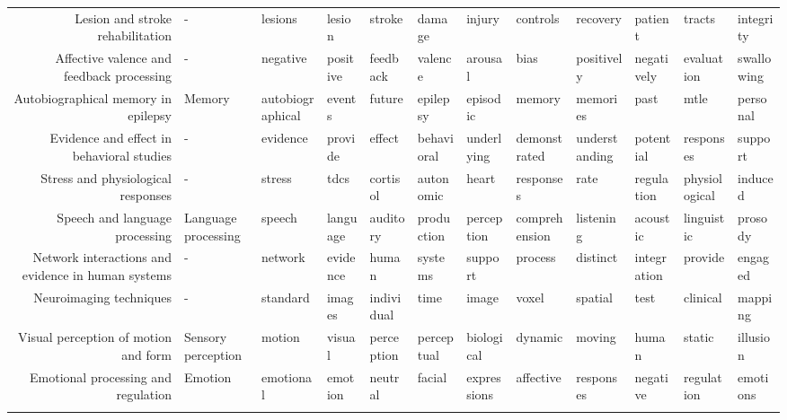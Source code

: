 \documentclass[english]{article}
\begin{document}
\begin{landscape}
\begin{center}
\begin{supertabular}{rlllllllllll}
    Lesion and stroke rehabilitation &                   - &          lesions &        lesion &          stroke &         damage &      injury &       controls &      recovery &        patient &        tracts &      integrity \\
Affective valence and feedback processing &                   - &         negative &      positive &        feedback &        valence &     arousal &           bias &    positively &     negatively &    evaluation &     swallowing \\
 Autobiographical memory in epilepsy &              Memory & autobiographical &        events &          future &       epilepsy &    episodic &         memory &      memories &           past &          mtle &       personal \\
Evidence and effect in behavioral studies &                   - &         evidence &       provide &          effect &     behavioral &  underlying &   demonstrated & understanding &      potential &     responses &        support \\
  Stress and physiological responses &                   - &           stress &          tdcs &        cortisol &      autonomic &       heart &      responses &          rate &     regulation & physiological &        induced \\
      Speech and language processing & Language processing &           speech &      language &        auditory &     production &  perception &  comprehension &     listening &       acoustic &    linguistic &        prosody \\
Network interactions and evidence in human systems &                   - &          network &      evidence &           human &        systems &     support &        process &      distinct &    integration &       provide &        engaged \\
             Neuroimaging techniques &                   - &         standard &        images &      individual &           time &       image &          voxel &       spatial &           test &      clinical &        mapping \\
Visual perception of motion and form &  Sensory perception &           motion &        visual &      perception &     perceptual &  biological &        dynamic &        moving &          human &        static &       illusion \\
 Emotional processing and regulation &             Emotion &        emotional &       emotion &         neutral &         facial & expressions &      affective &     responses &       negative &    regulation &       emotions \\



 
 \label{tab:topics}


\end{supertabular}
\end{center}
\end{landscape}
\end{document}
